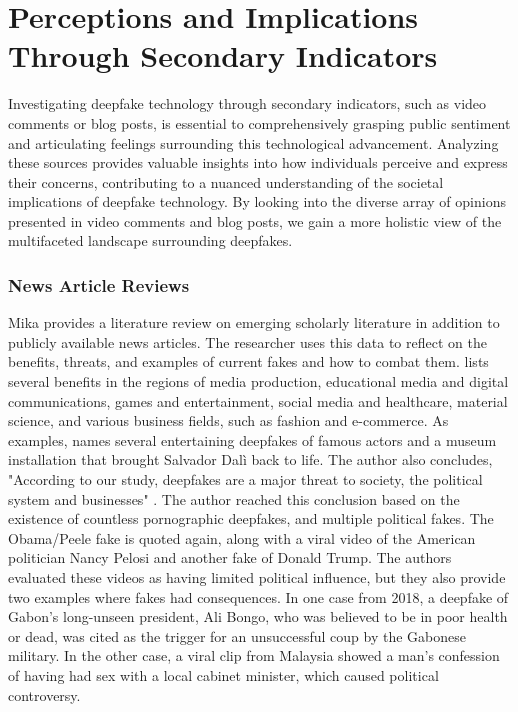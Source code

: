 \documentclass[
  a4paper,  %
  twoside,  %
  bibliography=totoc,
  headsepline,
  cleardoublepage=empty,
  parskip=half,
  draft=false
]{scrbook}
\begin{document}
\section{Perceptions and Implications Through Secondary Indicators} 
\label{sec:rel-secondary}

Investigating deepfake technology through secondary indicators, such as video comments or blog posts, is essential to comprehensively grasping public sentiment and articulating feelings surrounding this technological advancement. Analyzing these sources provides valuable insights into how individuals perceive and express their concerns, contributing to a nuanced understanding of the societal implications of deepfake technology. By looking into the diverse array of opinions presented in video comments and blog posts, we gain a more holistic view of the multifaceted landscape surrounding deepfakes.

\subsubsection*{News Article Reviews}
Mika \citeauthor{westerlundEmergenceDeepfakeTechnology2019a} provides a literature review on emerging scholarly literature in addition to publicly available news articles. The researcher uses this data to reflect on the benefits, threats, and examples of current fakes and how to combat them. \citeauthor{westerlundEmergenceDeepfakeTechnology2019a} lists several benefits in the regions of media production, educational media and digital communications, games and entertainment, social media and healthcare, material science, and various business fields, such as fashion and e-commerce. As examples, \citeauthor{westerlundEmergenceDeepfakeTechnology2019a} names several entertaining deepfakes of famous actors and a museum installation that brought Salvador Dalì back to life. The author also concludes, "According to our study, deepfakes are a major threat to society, the political system and businesses" \cite[p. 47]{westerlundEmergenceDeepfakeTechnology2019a}. The author reached this conclusion based on the existence of countless pornographic deepfakes, and multiple political fakes. The Obama/Peele fake is quoted again, along with a viral video of the American politician Nancy Pelosi and another fake of Donald Trump. The authors evaluated these videos as having limited political influence, but they also provide two examples where fakes had consequences. In one case from 2018, a deepfake of Gabon's long-unseen president, Ali Bongo, who was believed to be in poor health or dead, was cited as the trigger for an unsuccessful coup by the Gabonese military. In the other case, a viral clip from Malaysia showed a man's confession of having had sex with a local cabinet minister, which caused political controversy.
\end{document}
